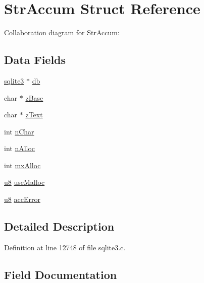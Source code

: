 \hypertarget{struct_str_accum}{}\section{Str\+Accum Struct Reference}
\label{struct_str_accum}


Collaboration diagram for Str\+Accum\+:
\subsection*{Data Fields}
\begin{DoxyCompactItemize}
\item 
\hyperlink{structsqlite3}{sqlite3} $\ast$ \hyperlink{struct_str_accum_ad6e663497d2c934364b3bcf07496b30b}{db}
\item 
char $\ast$ \hyperlink{struct_str_accum_a73244b7a261f7cc837bf5f73b487e8c3}{z\+Base}
\item 
char $\ast$ \hyperlink{struct_str_accum_a5b0f04eca8815fab4b6b31b41282f992}{z\+Text}
\item 
int \hyperlink{struct_str_accum_a3b4b4c05c7ab6c41b9cdf4e8bac74270}{n\+Char}
\item 
int \hyperlink{struct_str_accum_aec887fbb53f08664685baf4fb69ba5f5}{n\+Alloc}
\item 
int \hyperlink{struct_str_accum_a130d420f3104ea9587bd93b449573886}{mx\+Alloc}
\item 
\hyperlink{sqlite3_8c_a74a0f6424ae628af25f23f0a35f6ead3}{u8} \hyperlink{struct_str_accum_a68041f06bab26b9fecf18e56febbf150}{use\+Malloc}
\item 
\hyperlink{sqlite3_8c_a74a0f6424ae628af25f23f0a35f6ead3}{u8} \hyperlink{struct_str_accum_a3e843437fedb66c308590239ede54574}{acc\+Error}
\end{DoxyCompactItemize}


\subsection{Detailed Description}


Definition at line 12748 of file sqlite3.\+c.



\subsection{Field Documentation}
\hypertarget{struct_str_accum_a3e843437fedb66c308590239ede54574}{}
